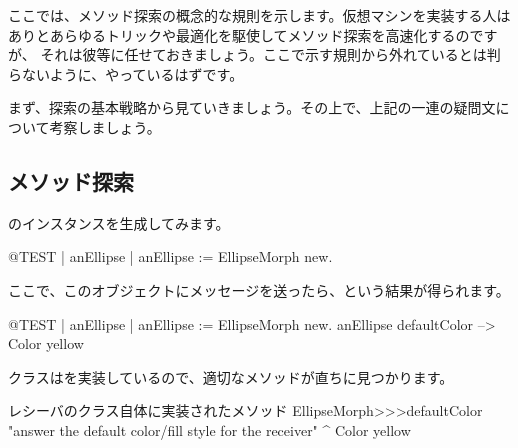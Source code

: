 \documentclass[a4paper,10pt,twoside]{book}
\begin{document}
ここでは、メソッド探索の概念的な規則を示します。仮想マシンを実装する人はありとあらゆるトリックや最適化を駆使してメソッド探索を高速化するのですが、
それは彼等に任せておきましょう。ここで示す規則から外れているとは判らないように、やっているはずです。

まず、探索の基本戦略から見ていきましょう。その上で、上記の一連の疑問文について考察しましょう。

\subsection{メソッド探索}
のインスタンスを生成してみます。
\begin{code}{@TEST | anEllipse |}
anEllipse := EllipseMorph new.
\end{code}
\noindent
ここで、このオブジェクトにメッセージを送ったら、という結果が得られます。
\begin{code}{@TEST | anEllipse | anEllipse := EllipseMorph new.}
anEllipse defaultColor --> Color yellow
\end{code}
\noindent
クラスはを実装しているので、適切なメソッドが直ちに見つかります。

\begin{method}[defaultColor]{レシーバのクラス自体に実装されたメソッド}
EllipseMorph>>>defaultColor
	"answer the default color/fill style for the receiver"
	^ Color yellow
\end{method}
\end{document}
